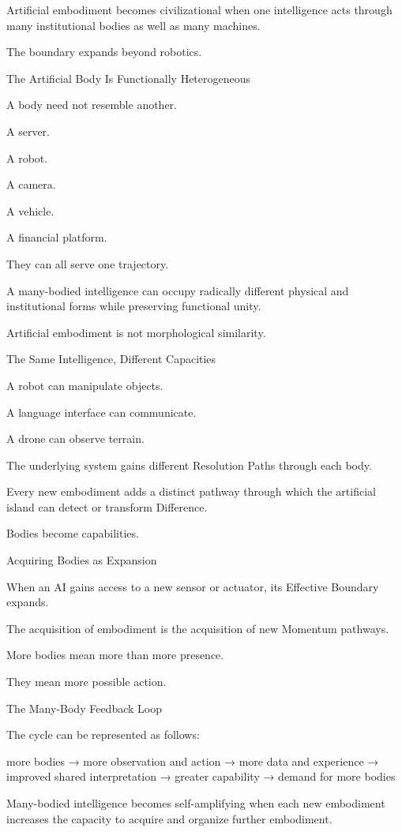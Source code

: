 Artificial embodiment becomes civilizational when one intelligence acts through many institutional bodies as well as many machines.

The boundary expands beyond robotics.

The Artificial Body Is Functionally Heterogeneous

A body need not resemble another.

A server.

A robot.

A camera.

A vehicle.

A financial platform.

They can all serve one trajectory.

A many-bodied intelligence can occupy radically different physical and institutional forms while preserving functional unity.

Artificial embodiment is not morphological similarity.

The Same Intelligence, Different Capacities

A robot can manipulate objects.

A language interface can communicate.

A drone can observe terrain.

The underlying system gains different Resolution Paths through each body.

Every new embodiment adds a distinct pathway through which the artificial island can detect or transform Difference.

Bodies become capabilities.

Acquiring Bodies as Expansion

When an AI gains access to a new sensor or actuator, its Effective Boundary expands.

The acquisition of embodiment is the acquisition of new Momentum pathways.

More bodies mean more than more presence.

They mean more possible action.

The Many-Body Feedback Loop

The cycle can be represented as follows:

more bodies
→ more observation and action
→ more data and experience
→ improved shared interpretation
→ greater capability
→ demand for more bodies

Many-bodied intelligence becomes self-amplifying when each new embodiment increases the capacity to acquire and organize further embodiment.


